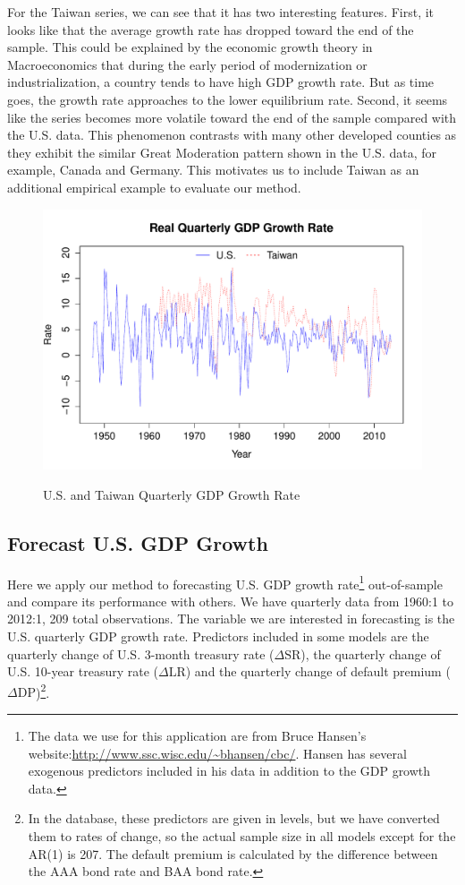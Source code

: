 For the Taiwan series, we can see that it has two interesting features. First, it looks like that the average growth rate has dropped toward the end of the sample. This could be explained by the economic growth theory in Macroeconomics that during the early period of modernization or industrialization, a country tends to have high GDP growth rate. But as time goes, the growth rate approaches to the lower equilibrium rate. Second, it seems like the series becomes more volatile toward the end of the sample compared with the U.S. data. This phenomenon contrasts with many other developed counties as they exhibit the similar Great Moderation pattern shown in the U.S. data, for example, Canada and Germany. This motivates us to include Taiwan as an additional empirical example to evaluate our method.
\begin{figure} \centering
	\caption{U.S. and Taiwan Quarterly GDP Growth Rate}
    \includegraphics[scale=0.7]{gdp_ts.pdf}
	\label{fig1}
\end{figure}
\subsection{Forecast U.S. GDP Growth}
Here we apply our method to forecasting U.S. GDP growth rate\footnote{The data we use for this application are from Bruce Hansen's website:\url{http://www.ssc.wisc.edu/~bhansen/cbc/}. Hansen has several exogenous predictors included in his data in addition to the GDP growth data.} out-of-sample and compare its performance with others. We have quarterly data from 1960:1 to 2012:1, 209 total observations. The variable we are interested in forecasting is the U.S. quarterly GDP growth rate. Predictors included in some models are the quarterly change of U.S. 3-month treasury rate ($\Delta\mathrm{SR}$), the quarterly change of U.S. 10-year treasury rate ($\Delta\mathrm{LR}$) and the quarterly change of default premium ($\Delta\mathrm{DP}$)\footnote{In the database, these predictors are given in levels, but we have converted them to rates of change, so the actual sample size in all models except for the AR(1) is 207. The default premium is calculated by the difference between the AAA bond rate and BAA bond rate.}.

